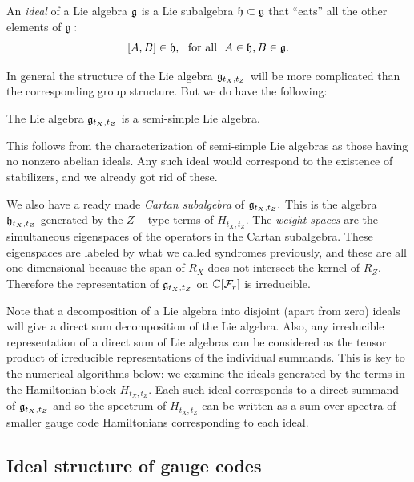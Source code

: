 An \emph{ideal} of a Lie algebra $\mathfrak{g}$
is a Lie subalgebra $\mathfrak{h}\subset\mathfrak{g}$ that ``eats''
all the other elements of $\mathfrak{g}:$
$$
    [A, B] \in \mathfrak{h}, \ \ \mbox{for all}\ \  A\in\mathfrak{h}, B\in\mathfrak{g}.
$$

In general the structure of the Lie algebra $\mathfrak{g}_{t_X,t_Z}$ 
will be more complicated than the corresponding group structure.
But we do have the following:
\begin{framed}
The Lie algebra $\mathfrak{g}_{t_X,t_Z}$ is a semi-simple Lie algebra.
\end{framed}
This follows from the characterization of
semi-simple Lie algebras as those having no
nonzero abelian ideals.
Any such ideal would correspond to the existence of 
stabilizers, and we already got rid of these.

We also have a ready made \emph{Cartan subalgebra} of $\mathfrak{g}_{t_X,t_Z}.$ 
This is the algebra $\mathfrak{h}_{t_X,t_Z}$ generated by the $Z-$type terms of $H_{t_X,t_Z}.$
The \emph{weight spaces} are the simultaneous eigenspaces
of the operators in the Cartan subalgebra. These
eigenspaces are labeled by what we called syndromes previously,
and these are all one dimensional because the span of $R_X$ does
not intersect the kernel of $R_Z.$
Therefore the representation of 
$\mathfrak{g}_{t_X,t_Z}$ on $\mathbb{C}[\mathcal{F}_{r}]$ is irreducible.

Note that a decomposition of a Lie algebra
into disjoint (apart from zero)
ideals will give a direct sum decomposition of
the Lie algebra.
Also, any irreducible representation of a direct sum of Lie algebras can
be considered as the tensor product of irreducible representations of the
individual summands.
This is key to the numerical algorithms below:
we examine the ideals generated by
the terms in the Hamiltonian block $H_{t_X,t_Z}.$
Each such ideal corresponds to a direct summand of $\mathfrak{g}_{t_X,t_Z}$ 
and so the spectrum of  $H_{t_X,t_Z}$
can be written as a sum over spectra of smaller gauge code Hamiltonians
corresponding to each ideal.


\subsection{Ideal structure of gauge codes}

